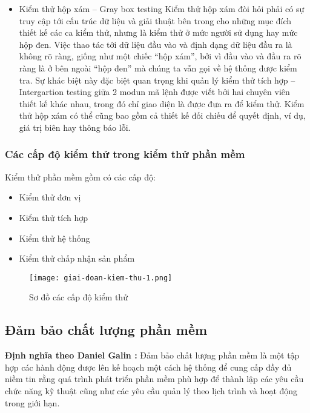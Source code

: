\begin{itemize}
		\item Kiểm thử hộp xám – Gray box testing
		Kiểm thử hộp xám đòi hỏi phải có sự truy cập tới cấu trúc dữ liệu và giải thuật bên trong cho những mục đích thiết kế các ca kiểm thử, nhưng là kiểm thử ở mức người sử dụng hay mức hộp đen. Việc thao tác tới dữ liệu đầu vào và định dạng dữ liệu đầu ra là không rõ ràng, giống như một chiếc “hộp xám”, bởi vì đầu vào và đầu ra rõ ràng là ở bên ngoài “hộp đen” mà chúng ta vẫn gọi về hệ thống được kiểm tra. Sự khác biệt này đặc biệt quan trọng khi quản lý kiểm thử tích hợp – Intergartion testing giữa 2 modun mã lệnh được viết bởi hai chuyên viên thiết kế khác nhau, trong đó chỉ giao diện là được đưa ra để kiểm thử. Kiểm thử hộp xám có thể cũng bao gồm cả thiết kế đối chiếu để quyết định, ví dụ, giá trị biên hay thông báo lỗi.				
		
	\end{itemize}

	\subsubsection{Các cấp độ kiểm thử trong kiểm thử phần mềm}
	Kiểm thử phần mềm gồm có các cấp độ: 
	\begin{itemize}
		\item Kiểm thử đơn vị
		\item Kiểm thử tích hợp
		\item Kiểm thử hệ thống
		\item Kiểm thử chấp nhận sản phẩm
	\end{itemize}
	
	\begin{center}
		\begin{figure}[htp]
			\begin{center}
				\texttt{[image: giai-doan-kiem-thu-1.png]}
			\end{center}
			\caption{Sơ đồ các cấp độ kiểm thử}
			\label{refhinh1}
		\end{figure}
	\end{center}
	

	

	\subsection{Đảm bảo chất lượng phần mềm}
	\textbf{Định nghĩa theo Daniel Galin \cite{galin2004software}:} Đảm bảo chất lượng phần mềm là một tập hợp các hành động được lên kế hoạch một cách hệ thống để cung cấp đầy đủ niềm tin rằng quá trình phát triển phần mềm phù hợp để thành lập các yêu cầu chức năng kỹ thuật cũng như các yêu cầu quản lý theo lịch trình và hoạt động trong giới hạn.



